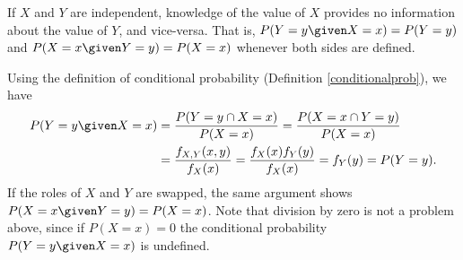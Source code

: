 \begin{thm}\label{independenceinfo}If $X$ and $Y$ are independent, knowledge of the value of $X$ provides no information about the value of $Y$, and vice-versa. That is, $P(Y = y \given X = x) = P(Y = y)$ and $P(X = x \given Y = y) = P(X = x)$ whenever both sides are defined.
\end{thm}
\begin{pf} Using the definition of conditional probability (Definition \ref{conditionalprob}), we have
$$\begin{aligned}P(Y = y \given X = x) &= \frac{P(Y = y \cap  X = x)}{P(X = x)} = \frac{P(X = x \cap  Y = y)}{P(X = x)} \\ &= \frac{f_{X,Y}(x,y)}{f_X(x)} = \frac{f_X(x)f_Y(y)}{f_X(x)} = f_Y(y) = P(Y = y). \end{aligned}$$
If the roles of $X$ and $Y$ are swapped, the same argument shows $P(X = x \given Y = y) = P(X = x)$. Note that division by zero is not a problem above, since if $P(X = x) = 0$ the conditional probability $P(Y = y \given X = x)$ is undefined.
\end{pf}

